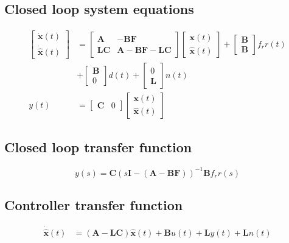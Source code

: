 \subsection*{Closed loop system equations}
\begin{align*}
\begin{bmatrix}\dot{\boldsymbol{x}}\left(t\right)\\
\dot{\hat{\boldsymbol{x}}}\left(t\right)
\end{bmatrix} & =\begin{bmatrix}\boldsymbol{A} & -\boldsymbol{B}\boldsymbol{F}\\
\boldsymbol{L}\boldsymbol{C} & \boldsymbol{A}-\boldsymbol{B}\boldsymbol{F}-\boldsymbol{L}\boldsymbol{C}
\end{bmatrix}\begin{bmatrix}\boldsymbol{x}\left(t\right)\\
\hat{\boldsymbol{x}}\left(t\right)
\end{bmatrix}+\begin{bmatrix}\boldsymbol{B}\\
\boldsymbol{B}
\end{bmatrix}f_{r}r\left(t\right)\\
 & +\begin{bmatrix}\boldsymbol{B}\\
0
\end{bmatrix}d\left(t\right)+\begin{bmatrix}0\\
\boldsymbol{L}
\end{bmatrix}n\left(t\right)\\
y\left(t\right) & =\begin{bmatrix}\boldsymbol{C} & 0\end{bmatrix}\begin{bmatrix}\boldsymbol{x}\left(t\right)\\
\hat{\boldsymbol{x}}\left(t\right)
\end{bmatrix}
\end{align*}

\subsection*{Closed loop transfer function}
\[
y(s)=\boldsymbol{C}(s\boldsymbol{I}-(\boldsymbol{A}-\boldsymbol{B}\boldsymbol{F}))^{-1}\boldsymbol{B}f_{r}r(s)
\]

\subsection*{Controller transfer function}
\begin{align*}
\dot{\hat{\boldsymbol{x}}}\left(t\right) & =\left(\boldsymbol{A}-\boldsymbol{L}\boldsymbol{C}\right)\hat{\boldsymbol{x}}\left(t\right)+\boldsymbol{B}u\left(t\right)+\boldsymbol{L}y\left(t\right)+\boldsymbol{L}n\left(t\right)
\end{align*}

